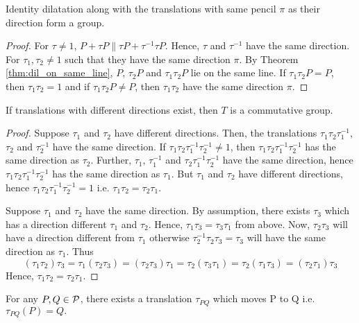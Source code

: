 \begin{theorem}
    Identity dilatation along with the translations with same pencil $\pi$ as their direction form a group.
\end{theorem}

\begin{proof}
    For  $\tau \neq 1$, $P + \tau P \parallel \tau P + \tau^{-1} \tau P$. Hence, $\tau$ and $\tau^{-1}$ have the same direction. For $\tau_1, \tau_2 \neq 1$ such that they have the same direction $\pi$. By Theorem \ref{thm:dil_on_same_line}, $P$, $\tau_2 P$ and $\tau_1 \tau_2 P$ lie on the same line. If $\tau_1 \tau_2 P = P$, then $\tau_1 \tau_2 = 1$  and if $\tau_1 \tau_2 P \neq P$, then $\tau_1 \tau_2$ have the same direction $\pi.$
\end{proof}

\begin{theorem}
    If translations with different directions exist, then $T$ is a commutative group.
\end{theorem}

\begin{proof}
    Suppose $\tau_1$ and $\tau_2$ have different directions. Then, the translations $\tau_1 \tau_2 \tau_1^{-1}$, $\tau_2$ and $\tau_2^{-1}$ have the same direction. If $\tau_1 \tau_2 \tau_1^{-1}\tau_2^{-1} \neq 1$, then $\tau_1 \tau_2 \tau_1^{-1}\tau_2^{-1}$ has the same direction as $\tau_2$. Further, $\tau_1$, $\tau_1^{-1}$ and $\tau_2 \tau_1^{-1}\tau_2^{-1}$ have the same direction, hence $\tau_1 \tau_2 \tau_1^{-1}\tau_2^{-1}$ has the same direction as $\tau_1$. But $\tau_1$ and $\tau_2$ have different directions, hence $\tau_1 \tau_2 \tau_1^{-1}\tau_2^{-1} =1$ i.e.  $\tau_1 \tau_2=\tau_2 \tau_1$.

    \vspace{1ex}

    Suppose $\tau_1$ and $\tau_2$ have the same direction. By assumption, there exists $\tau_3$ which has a direction different $\tau_1 $ and $\tau_2$. Hence, $\tau_1 \tau_3 = \tau_3 \tau_1$ from above. Now, $\tau_2 \tau_3$ will have a direction different from $\tau_1$ otherwise $\tau_2^{-1} \tau_2 \tau_3 = \tau_3$ will have the same direction as $\tau_1$. Thus
    \[ (\tau_1 \tau_2 ) \tau_3 = \tau_1 (\tau_2\tau_3) = (\tau_2 \tau_3) \tau_1 = \tau_2 (\tau_3 \tau_1) = \tau_2 (\tau_1 \tau_3) = (\tau_2 \tau_1) \tau_3 \]
    Hence, $\tau_1 \tau_2=\tau_2 \tau_1$.
\end{proof}

\begin{axiom}[4a]
    For any $P,Q \in \mathcal{P}$, there exists a translation $\tau_{PQ}$ which moves P to Q i.e. $\tau_{PQ}(P)=Q.$ 
\end{axiom}

